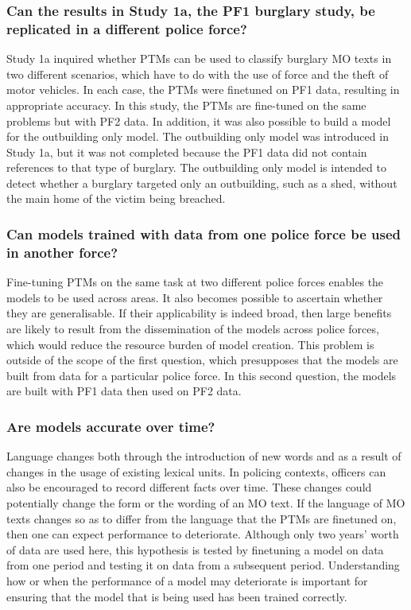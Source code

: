 \subsubsection{Can the results in Study 1a, the PF1 burglary study, be replicated in a different police force?} Study 1a inquired whether PTMs can be used to classify burglary MO texts in two different scenarios, which have to do with the use of force and the theft of motor vehicles. In each case, the PTMs were finetuned on PF1 data, resulting in appropriate accuracy. In this study, the PTMs are fine-tuned on the same problems but with PF2 data. In addition, it was also possible to build a model for the outbuilding only model. The outbuilding only model was introduced in Study 1a, but it was not completed because the PF1 data did not contain references to that type of burglary. The outbuilding only model is intended to detect whether a burglary targeted only an outbuilding, such as a shed, without the main home of the victim being breached.

\subsubsection{Can models trained with data from one police force be used in another force?} Fine-tuning PTMs on the same task at two different police forces enables the models to be used across areas. It also becomes possible to ascertain whether they are generalisable. If their applicability is indeed broad, then large benefits are likely to result from the dissemination of the models across police forces, which would reduce the resource burden of model creation. This problem is outside of the scope of the first question, which presupposes that the models are built from data for a particular police force. In this second question, the models are built with PF1 data then used on PF2 data.

\subsubsection{Are models accurate over time?} Language changes both through the introduction of new words and as a result of changes in the usage of existing lexical units. In policing contexts, officers can also be encouraged to record different facts over time. These changes could potentially change the form or the wording of an MO text. If the language of MO texts changes so as to differ from the language that the PTMs are finetuned on, then one can expect performance to deteriorate. Although only two years’ worth of data are used here, this hypothesis is tested by finetuning a model on data from one period and testing it on data from a subsequent period. Understanding how or when the performance of a model may deteriorate is important for ensuring that the model that is being used has been trained correctly.


